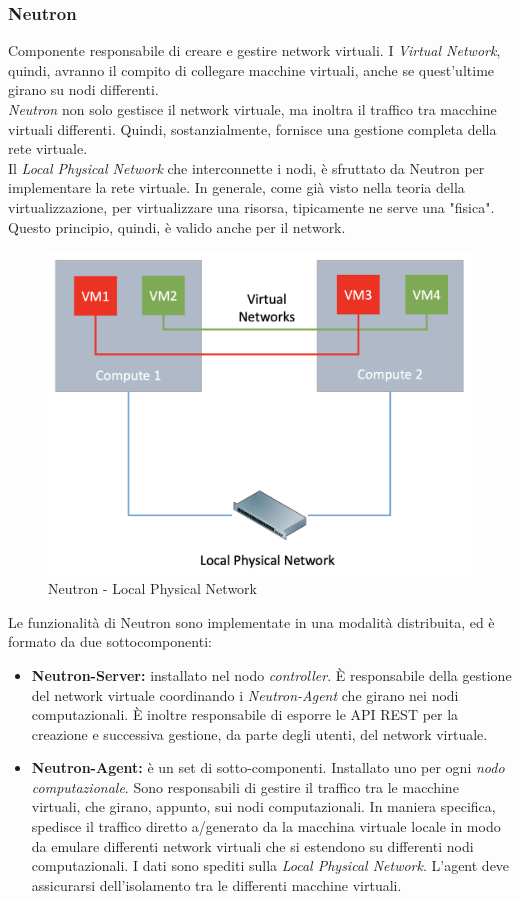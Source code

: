 \documentclass{article}
\begin{document}
\subsubsection{Neutron}
Componente responsabile di creare e gestire network virtuali. I \textit{Virtual Network}, quindi, avranno il compito di collegare macchine virtuali, anche se quest'ultime girano su nodi differenti. \\
\textit{Neutron} non solo gestisce il network virtuale, ma inoltra il traffico tra macchine virtuali differenti. Quindi, sostanzialmente, fornisce una gestione completa della rete virtuale. \\
Il \textit{Local Physical Network} che interconnette i nodi, è sfruttato da Neutron per implementare la rete virtuale. In generale, come già visto nella teoria della virtualizzazione, per virtualizzare una risorsa, tipicamente ne serve una "fisica". Questo principio, quindi, è valido anche per il network. 
\begin{figure}[H]
    \centering
    \includegraphics[scale=0.2]{img/neutron local physical.png}
    \caption{Neutron - Local Physical Network}
\end{figure}\noindent
Le funzionalità di Neutron sono implementate in una modalità distribuita, ed è formato da due sottocomponenti:
\begin{itemize}
    \item \textbf{Neutron-Server:} installato nel nodo \textit{controller}. È responsabile della gestione del network virtuale coordinando i \textit{Neutron-Agent} che girano nei nodi computazionali. È inoltre responsabile di esporre le API REST per la creazione e successiva gestione, da parte degli utenti, del network virtuale.
    \item \textbf{Neutron-Agent:} è un set di sotto-componenti. Installato uno per ogni \textit{nodo computazionale}. Sono responsabili di gestire il traffico tra le macchine virtuali, che girano, appunto, sui nodi computazionali. In maniera specifica, spedisce il traffico diretto a/generato da la macchina virtuale locale in modo da emulare differenti network virtuali che si estendono su differenti nodi computazionali. I dati sono spediti sulla \textit{Local Physical Network}. L'agent deve assicurarsi dell'isolamento tra le differenti macchine virtuali.
\end{itemize}
\end{document}
